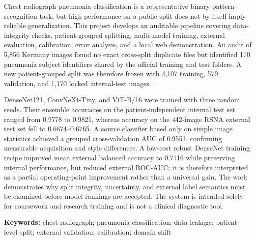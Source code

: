 Chest radiograph pneumonia classification is a representative binary pattern-recognition task, but high performance on a public split does not by itself imply reliable generalization. This project develops an auditable pipeline covering data-integrity checks, patient-grouped splitting, multi-model training, external evaluation, calibration, error analysis, and a local web demonstration. An audit of 5,856 Kermany images found no exact cross-split duplicate files but identified 170 pneumonia subject identifiers shared by the official training and test folders. A new patient-grouped split was therefore frozen with 4,107 training, 579 validation, and 1,170 locked internal-test images.

DenseNet121, ConvNeXt-Tiny, and ViT-B/16 were trained with three random seeds. Their ensemble accuracies on the patient-independent internal test set ranged from 0.9778 to 0.9821, whereas accuracy on the 442-image RSNA external test set fell to 0.6674--0.6765. A source classifier based only on simple image statistics achieved a grouped cross-validation AUC of 0.9551, confirming measurable acquisition and style differences. A low-cost robust DenseNet training recipe improved mean external balanced accuracy to 0.7116 while preserving internal performance, but reduced external ROC-AUC; it is therefore interpreted as a partial operating-point improvement rather than a universal gain. The work demonstrates why split integrity, uncertainty, and external label semantics must be examined before model rankings are accepted. The system is intended solely for coursework and research training and is not a clinical diagnostic tool.

\noindent\textbf{Keywords:} chest radiograph; pneumonia classification; data leakage; patient-level split; external validation; calibration; domain shift

